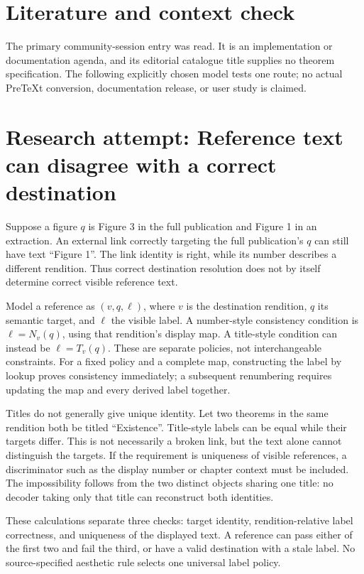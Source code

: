 \documentclass[11pt]{article}
\begin{document}
\section{Literature and context check}
The primary community-session entry was read. It is an implementation or documentation agenda, and its editorial catalogue title supplies no theorem specification. The following explicitly chosen model tests one route; no actual PreTeXt conversion, documentation release, or user study is claimed.
\section{Research attempt: Reference text can disagree with a correct destination}
Suppose a figure $q$ is Figure 3 in the full publication and Figure 1 in an extraction. An external link correctly targeting the full publication's $q$ can still have text ``Figure 1''. The link identity is right, while its number describes a different rendition. Thus correct destination resolution does not by itself determine correct visible reference text.

Model a reference as $(v,q,\ell)$, where $v$ is the destination rendition, $q$ its semantic target, and $\ell$ the visible label. A number-style consistency condition is $\ell=N_v(q)$, using that rendition's display map. A title-style condition can instead be $\ell=T_v(q)$. These are separate policies, not interchangeable constraints. For a fixed policy and a complete map, constructing the label by lookup proves consistency immediately; a subsequent renumbering requires updating the map and every derived label together.

Titles do not generally give unique identity. Let two theorems in the same rendition both be titled ``Existence''. Title-style labels can be equal while their targets differ. This is not necessarily a broken link, but the text alone cannot distinguish the targets. If the requirement is uniqueness of visible references, a discriminator such as the display number or chapter context must be included. The impossibility follows from the two distinct objects sharing one title: no decoder taking only that title can reconstruct both identities.

These calculations separate three checks: target identity, rendition-relative label correctness, and uniqueness of the displayed text. A reference can pass either of the first two and fail the third, or have a valid destination with a stale label. No source-specified aesthetic rule selects one universal label policy.
\end{document}
